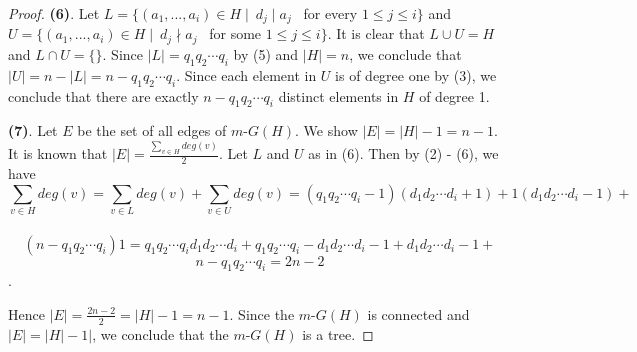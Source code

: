 \documentclass[10pt,a4paper]{amsart}
\begin{document}
\begin{proof}
\vskip 0.1in
{\bf (6)}.  Let $L = \{(a_1, ..., a_i) \in H \mid \   d_j \mid a_j$ \ for every $1 \leq j \leq i\}$ and $U = \{(a_1, ..., a_i) \in H \mid \   d_j \nmid a_j$ \ for some $1 \leq j \leq i\}$. It is clear that $L \cup U = H$ and $L \cap U = \{\}$. Since $|L| = q_1q_2 \cdots q_i$ by (5) and $|H| = n$, we conclude that $|U| = n - |L| = n - q_1q_2 \cdots q_i$.  Since each element in $U$ is of degree one by (3), we conclude that there are exactly $n - q_1q_2 \cdots q_i$ distinct elements in $H$ of degree 1.

\vskip 0.1in
{\bf (7)}. Let $E$ be the set of all edges of $m$-$G(H)$. We show $|E| = |H| - 1 = n - 1$. It is known that $|E| = \frac{\sum_{v \in H} deg(v)}{2}$. Let $L$ and $U$ as in (6). Then by (2) - (6), we have
$$\sum_{v \in H} deg(v) = \sum_{v \in L} deg(v) + \sum_{v \in U} deg(v) = (q_1q_2 \cdots q_i - 1)(d_1d_2 \cdots d_i + 1) + 1(d_1d_2\cdots d_i - 1) + $$\\ $$(n - q_1q_2 \cdots q_i)1 = q_1q_2 \cdots q_i d_1d_2\cdots d_i + q_1q_2 \cdots q_i - d_1d_2\cdots d_i - 1 + d_1d_2\cdots d_i - 1 +$$ \newline   $$n - q_1q_2\cdots q_i = 2n - 2$$.

Hence $|E| = \frac{2n - 2}{2} = |H| -1 = n-1$. Since the $m$-$G(H)$ is connected and $|E| = |H| - 1|$, we conclude that the $m$-$G(H)$ is a tree.

\end{proof}
\end{document}
